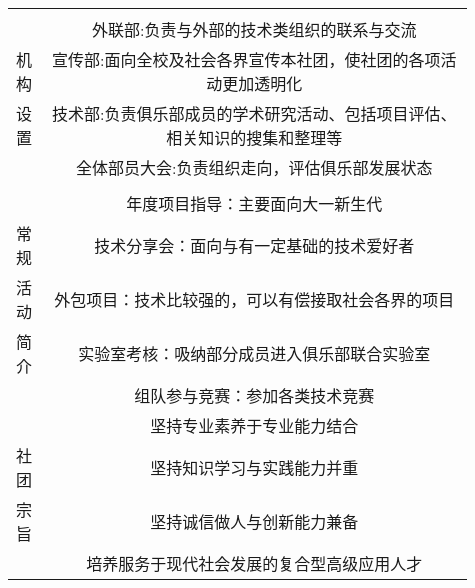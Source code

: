 \documentclass{BaseSetting}
\begin{document}
\begin{table}[H]
\begin{tabular}{|p{0.05\linewidth}|p{0.3\linewidth}|p{0.28\linewidth}|p{0.28\linewidth}|}
		     & \multicolumn{3}{c|}{}                                                                                                            \\
		     & \multicolumn{3}{c|}{外联部:负责与外部的技术类组织的联系与交流}                                                                   \\
		机构 & \multicolumn{3}{c|}{宣传部:面向全校及社会各界宣传本社团，使社团的各项活动更加透明化}                                             \\
		设置 & \multicolumn{3}{c|}{技术部:负责俱乐部成员的学术研究活动、包括项目评估、相关知识的搜集和整理等}                                   \\
		     & \multicolumn{3}{c|}{全体部员大会:负责组织走向，评估俱乐部发展状态}                                                               \\
		     & \multicolumn{3}{c|}{}                                                                                                            \\\hline

		     & \multicolumn{3}{c|}{年度项目指导：主要面向大一新生代}                                                                            \\
		常规 & \multicolumn{3}{c|}{技术分享会：面向与有一定基础的技术爱好者}                                                                    \\
		活动 & \multicolumn{3}{c|}{外包项目：技术比较强的，可以有偿接取社会各界的项目}                                                          \\
		简介 & \multicolumn{3}{c|}{实验室考核：吸纳部分成员进入俱乐部联合实验室}                                                                \\
		     & \multicolumn{3}{c|}{组队参与竞赛：参加各类技术竞赛}                                                                              \\ \hline

		     & \multicolumn{3}{c|}{坚持专业素养于专业能力结合}                                                                                  \\
		社团 & \multicolumn{3}{c|}{坚持知识学习与实践能力并重}                                                                                  \\
		宗旨 & \multicolumn{3}{c|}{坚持诚信做人与创新能力兼备}                                                                                  \\
		     & \multicolumn{3}{c|}{培养服务于现代社会发展的复合型高级应用人才}                                                                  \\ \hline


\end{tabular}
\end{table}
\end{document}
